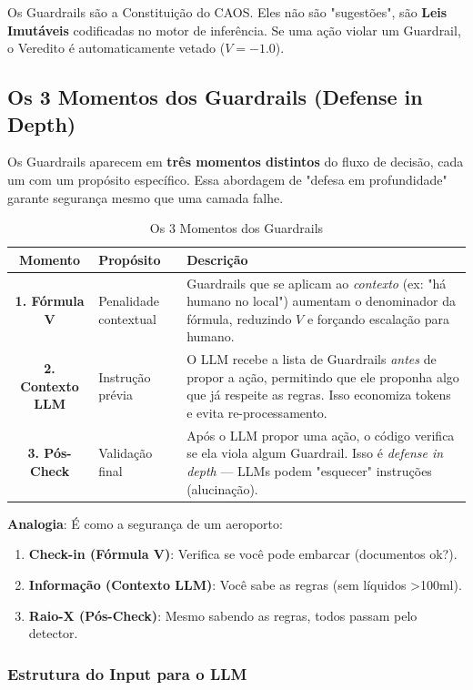 \documentclass[12pt, a4paper]{article}
\begin{document}
Os Guardrails são a Constituição do CAOS. Eles não são "sugestões", são \textbf{Leis Imutáveis} codificadas no motor de inferência. Se uma ação violar um Guardrail, o Veredito é automaticamente vetado ($V=-1.0$).

\subsection{Os 3 Momentos dos Guardrails (Defense in Depth)}

Os Guardrails aparecem em \textbf{três momentos distintos} do fluxo de decisão, cada um com um propósito específico. Essa abordagem de "defesa em profundidade" garante segurança mesmo que uma camada falhe.

\begin{table}[h!]
\centering
\small
\begin{tabularx}{\textwidth}{|c|l|X|}
\hline
\textbf{Momento} & \textbf{Propósito} & \textbf{Descrição} \\ \hline
\textbf{1. Fórmula V} & Penalidade contextual & Guardrails que se aplicam ao \textit{contexto} (ex: "há humano no local") aumentam o denominador da fórmula, reduzindo $V$ e forçando escalação para humano. \\ \hline
\textbf{2. Contexto LLM} & Instrução prévia & O LLM recebe a lista de Guardrails \textit{antes} de propor a ação, permitindo que ele proponha algo que já respeite as regras. Isso economiza tokens e evita re-processamento. \\ \hline
\textbf{3. Pós-Check} & Validação final & Após o LLM propor uma ação, o código verifica se ela viola algum Guardrail. Isso é \textit{defense in depth} — LLMs podem "esquecer" instruções (alucinação). \\ \hline
\end{tabularx}
\caption{Os 3 Momentos dos Guardrails}
\end{table}

\textbf{Analogia}: É como a segurança de um aeroporto:
\begin{enumerate}
    \item \textbf{Check-in (Fórmula V)}: Verifica se você pode embarcar (documentos ok?).
    \item \textbf{Informação (Contexto LLM)}: Você sabe as regras (sem líquidos >100ml).
    \item \textbf{Raio-X (Pós-Check)}: Mesmo sabendo as regras, todos passam pelo detector.
\end{enumerate}

\subsubsection{Estrutura do Input para o LLM}
\end{document}
